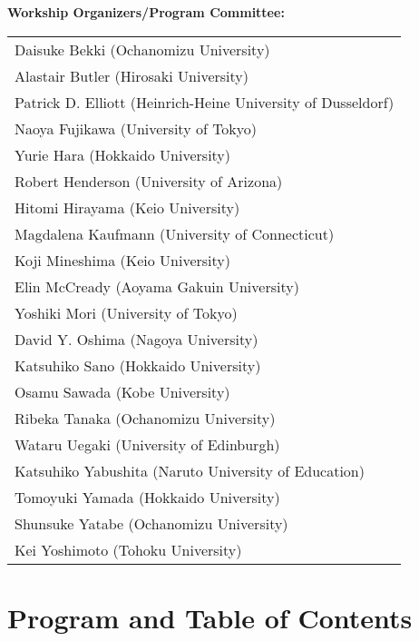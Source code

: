 \documentclass[12pt]{jarticle}
\begin{document}
\begin{center}
{\large \textbf{Workship Organizers/Program Committee:}} \\
\vspace*{1cm}
\begin{tabular}{l}
Daisuke Bekki (Ochanomizu University) \\
Alastair Butler (Hirosaki University) \\
Patrick D. Elliott (Heinrich-Heine University of Dusseldorf) \\
Naoya Fujikawa (University of Tokyo) \\
Yurie Hara (Hokkaido University) \\
Robert Henderson (University of Arizona) \\
Hitomi Hirayama (Keio University) \\
Magdalena Kaufmann (University of Connecticut) \\
Koji Mineshima (Keio University) \\
Elin McCready (Aoyama Gakuin University) \\
Yoshiki Mori (University of Tokyo) \\
David Y. Oshima (Nagoya University) \\
Katsuhiko Sano (Hokkaido University) \\
Osamu Sawada (Kobe University) \\
Ribeka Tanaka (Ochanomizu University) \\
Wataru Uegaki (University of Edinburgh) \\
Katsuhiko Yabushita (Naruto University of Education) \\
Tomoyuki Yamada (Hokkaido University) \\
Shunsuke Yatabe (Ochanomizu University) \\
Kei Yoshimoto (Tohoku University) \\

\end{tabular}
\end{center}
\newpage
  
\section*{Program and Table of Contents}

\newcommand{\slot}[2]{\noindent \underline{#1 \  #2} \\}
\newcommand{\talk}[3]{
  \noindent #2 \\ 
  \indent\indent \textit{#1} \dotfill #3 
  \smallskip \\
  }
\newcommand{\talkk}[3]{
  \noindent #2 \\ 
  \indent\indent \textit{#1}
  \smallskip \\
  }
\end{document}
